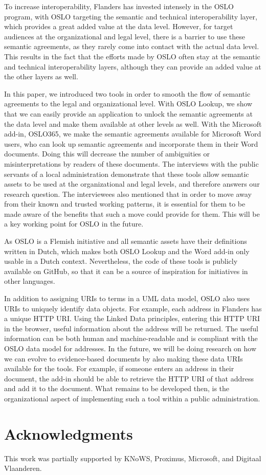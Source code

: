 \documentclass[manuscript]{acmart}
\begin{document}
To increase interoperability, Flanders has invested intensely in the OSLO program, with OSLO targeting the semantic and technical interoperability layer, which provides a great added value at the data level. 
However, for target audiences at the organizational and legal level, there is a barrier to use these semantic agreements, as they rarely come into contact with the actual data level.
This results in the fact that the efforts made by OSLO often stay at the semantic and technical interoperability layers, although they can provide an added value at the other layers as well.

In this paper, we introduced two tools in order to smooth the flow of semantic agreements to the legal and organizational level. 
With OSLO Lookup, we show that we can easily provide an application to  unlock the semantic agreements at the data level and make them available at other levels as well.
With the Microsoft add-in, OSLO365, we make the semantic agreements available for Microsoft Word users, who can look up semantic agreements and incorporate them in their Word documents. 
Doing this will decrease the number of ambiguities or misinterpretations by readers of these documents. 
The interviews with the public servants of a local administration demonstrate that these tools allow semantic assets to be used at the organizational and legal levels, and therefore answers our research question. 
The interviewees also mentioned that in order to move away from their known and trusted working patterns, it is essential for them to be made aware of the benefits that such a move could provide for them. 
This will be a key working point for OSLO in the future.

As OSLO is a Flemish initiative and all semantic assets have their definitions written in Dutch, which makes both OSLO Lookup and the Word add-in only usable in a Dutch context. 
Nevertheless, the code of these tools is publicly available on GitHub, so that it can be a source of inspiration for initiatives in other languages.

In addition to assigning URIs to terms in a UML data model, OSLO also uses URIs to uniquely identify data objects. 
For example, each address in Flanders has a unique HTTP URI. Using the Linked Data principles, entering this HTTP URI in the browser, useful information about the address will be returned. 
The useful information can be both human and machine-readable and is compliant with the OSLO data model for addresses. 
In the future, we will be doing research on how we can evolve to evidence-based documents by also making these data URIs available for the tools. 
For example, if someone enters an address in their document, the add-in should be able to retrieve the HTTP URI of that address and add it to the document.
What remains to be developed then, is the organizational aspect of implementing such a tool within a public administration.

\section{Acknowledgments}

This work was partially supported by KNoWS, Proximus, Microsoft, and Digitaal Vlaanderen.



\end{document}
